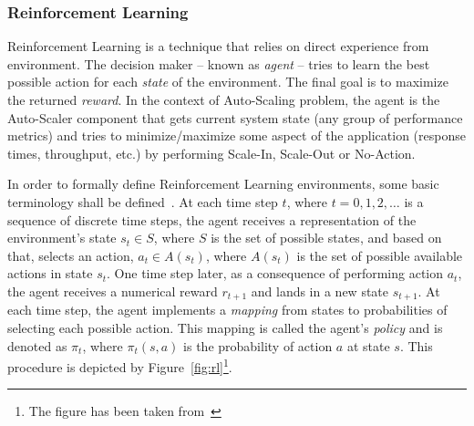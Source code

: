 \subsubsection{Reinforcement Learning}

Reinforcement Learning is a technique that relies on direct experience from environment. The decision maker -- known as \emph{agent} -- tries to learn the best possible action for each \emph{state} of the environment. The final goal is to maximize the returned \emph{reward}. In the context of Auto-Scaling problem, the agent is the Auto-Scaler component that gets current system state (any group of performance metrics) and tries to minimize/maximize some aspect of the application (response times, throughput, etc.) by performing Scale-In, Scale-Out or No-Action.

In order to formally define Reinforcement Learning environments, some basic terminology shall be defined~\cite{rlIntro}. At each time step $t$, where $t = 0,1,2,\dots$ is a sequence of discrete time steps, the agent receives a representation of the environment's state $s_t \in S$, where $S$ is the set of possible states, and based on that, selects an action, $a_t \in A(s_t)$, where $A(s_t)$ is the
set of possible available actions in state $s_t$. One time step later, as a consequence of performing action $a_t$, the agent receives a numerical reward $r_{t+1}$ and lands in a new state $s_{t+1}$. At each time step, the agent implements a \emph{mapping} from states to probabilities of selecting each possible action. This mapping is called the agent's \emph{policy} and is denoted as $\pi_t$, where $\pi_t(s,a)$ is the probability of action $a$ at state $s$. This procedure is depicted by Figure~\ref{fig:rl}\footnote{The figure has been taken from~\cite{rlIntro}}.
